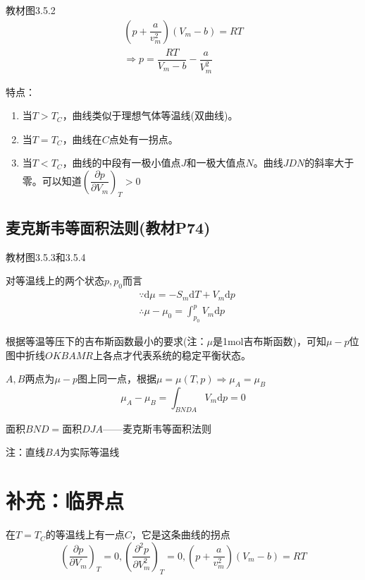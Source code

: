 \documentclass[oneside]{ctexbook}
\begin{document}
教材图3.5.2
\begin{gather*}
    \left(p+\dfrac{a}{v_m^2}\right)(V_m-b)=RT\\
    \Rightarrow{}p=\dfrac{RT}{V_m-b}-\dfrac{a}{V_m^2}
\end{gather*}

特点：
\begin{enumerate}
    \item 当\(T>T_C\)，曲线类似于理想气体等温线(双曲线)。
    \item 当\(T=T_C\)，曲线在\(C\)点处有一拐点。
    \item 当\(T<T_C\)，曲线的中段有一极小值点\(J\)和一极大值点\(N\)。曲线\(JDN\)的斜率大于零。可以知道\(\left(\dfrac{\partial{}p}{\partial{}V_m}\right)_T>0\)
\end{enumerate}
\subsection{麦克斯韦等面积法则(教材P74)}

教材图3.5.3和3.5.4

对等温线上的两个状态\(p,p_0\)而言
\begin{equation}
\begin{aligned}
    &\because\mathrm{d}\mu=-S_m\mathrm{d}T+V_m\mathrm{d}p\\
    &\therefore\mu-\mu_0=\int_{p_0}^pV_m\mathrm{d}p
\end{aligned}
\end{equation}

根据等温等压下的吉布斯函数最小的要求(注：\(\mu\)是1mol吉布斯函数)，可知\(\mu-p\)位图中折线\(OKBAMR\)上各点才代表系统的稳定平衡状态。

\(A,B\)两点为\(\mu-p\)图上同一点，根据\(\mu=\mu(T,p)\Rightarrow{}\mu_A=\mu_B\)
\begin{equation}
\mu_A-\mu_B=\int_{BNDA}V_m\mathrm{d}p=0
\end{equation}

面积\(BND=\)面积\(DJA\)——麦克斯韦等面积法则

注：直线\(BA\)为实际等温线

\section*{补充：临界点}

在\(T=T_C\)的等温线上有一点\(C\)，它是这条曲线的拐点
\begin{equation}
\left(\dfrac{\partial{}p}{\partial{}V_m}\right)_T=0,\left(\dfrac{\partial^2p}{\partial{}V_m^2}\right)_T=0,\left(p+\dfrac{a}{v_m^2}\right)(V_m-b)=RT
\end{equation}
\end{document}
